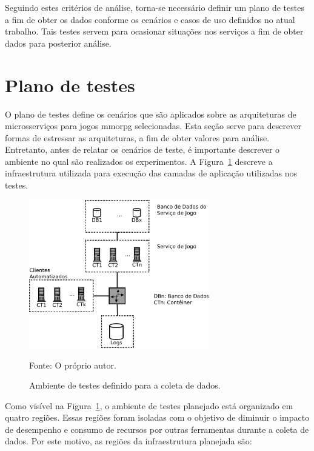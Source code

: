 Seguindo estes critérios de análise, torna-se necessário definir um plano de testes a fim de obter os dados conforme os cenários e casos de uso definidos no atual trabalho.
%
Tais testes servem para ocasionar situações nos serviços a fim de obter dados para posterior análise.



\section {Plano de testes}
\label{sec:plano}



O plano de testes define os cenários que são aplicados sobre as arquiteturas de microsserviços para jogos \ac{mmorpg} selecionadas.
%
Esta seção serve para descrever formas de estressar as arquiteturas, a fim de obter valores para análise.
%
Entretanto, antes de relatar os cenários de teste, é importante descrever o ambiente no qual são realizados os experimentos.
%
A Figura~\ref{Ambiente de testes} descreve a infraestrutura utilizada para execução das camadas de aplicação utilizadas nos testes.



\begin{figure}[htb!]
  \caption{Ambiente de testes definido para a coleta de dados.}
  \vspace{-0.3cm}
  \label{Ambiente de testes}
  \includegraphics[width=0.7\textwidth]{img/cap3/infraestrutura.png}
  \centering

  Fonte: O próprio autor.
\end{figure}

\pagebreak

Como visível na Figura~\ref{Ambiente de testes}, o ambiente de testes planejado está organizado em quatro regiões.
%
Essas regiões foram isoladas com o objetivo de diminuir o impacto de desempenho e consumo de recursos por outras ferramentas durante a coleta de dados.
%
Por este motivo, as regiões da infraestrutura planejada são:




